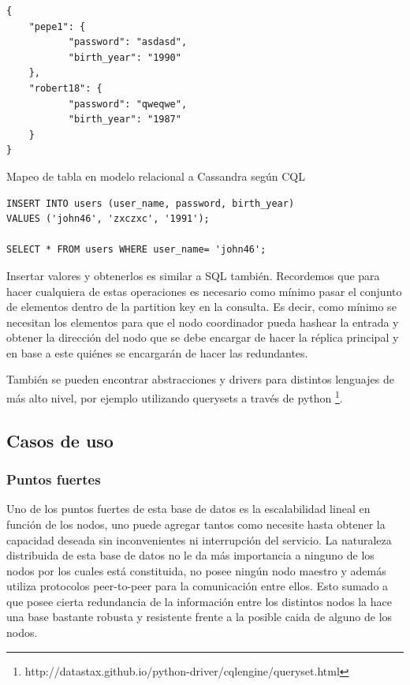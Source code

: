 \documentclass[11pt,a4paper]{article}
\begin{document}
\begin{listing}
\begin{verbatim}
{
	"pepe1": {
           "password": "asdasd",
		   "birth_year": "1990"
    },
    "robert18": {
           "password": "qweqwe",
		   "birth_year": "1987"
    }
}
\end{verbatim}
\caption{Mapeo de tabla en modelo relacional a Cassandra según CQL} 
\label{json-example}
\end{listing}

\begin{lstlisting}
INSERT INTO users (user_name, password, birth_year)
VALUES ('john46', 'zxczxc', '1991');

SELECT * FROM users WHERE user_name= 'john46';
\end{lstlisting}

Insertar valores y obtenerlos es similar a SQL también. Recordemos que para hacer cualquiera de estas operaciones es necesario como mínimo pasar el conjunto de elementos dentro de la partition key en la consulta. Es decir, como mínimo se necesitan los elementos para que el nodo coordinador pueda hashear la entrada y obtener la dirección del nodo que se debe encargar de hacer la réplica principal y en base a este quiénes se encargarán de hacer las redundantes.

También se pueden encontrar abstracciones y drivers para distintos lenguajes de más alto nivel, por ejemplo utilizando querysets a través de python \footnote{http://datastax.github.io/python-driver/cqlengine/queryset.html}.

\subsection{Casos de uso}

\subsubsection{Puntos fuertes}
Uno de los puntos fuertes de esta base de datos es la escalabilidad lineal en función de los nodos, uno puede agregar tantos como necesite hasta obtener la capacidad deseada sin inconvenientes ni interrupción del servicio. La naturaleza distribuida de esta base de datos no le da más importancia a ninguno de los nodos por los cuales está constituida, no posee ningún nodo maestro y además utiliza protocolos peer-to-peer para la comunicación entre ellos. Esto sumado a que posee cierta redundancia de la información entre los distintos nodos la hace una base bastante robusta y resistente frente a la posible caida de alguno de los nodos.
\end{document}
